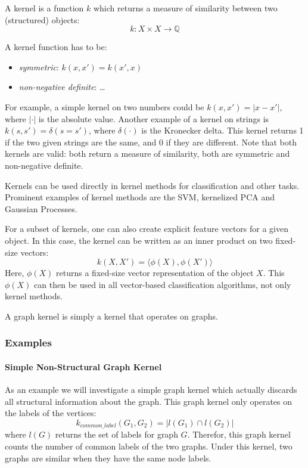 A kernel is a function $k$ which returns a measure of similarity between two (structured) objects:
\begin{equation*}
k: X \times X \rightarrow \mathbb{Q}
\end{equation*}

A kernel function has to be:
\begin{itemize}
    \item{\textit{symmetric}: $k(x, x') = k(x', x)$}
    \item{\textit{non-negative definite}: \dots}
\end{itemize}

For example, a simple kernel on two numbers could be $k(x, x') = | x - x' |$, where $| \cdot |$ is the absolute value.
Another example of a kernel on strings is $k(s, s') = \delta(s = s')$, where $\delta(\cdot)$ is the Kronecker delta. This kernel returns 1 if the two given strings are the same, and 0 if they are different.
Note that both kernels are valid: both return a measure of similarity, both are symmetric and non-negative definite.

Kernels can be used directly in kernel methods for classification and other tasks.
Prominent examples of kernel methods are the SVM, kernelized PCA and Gaussian Processes.

For a subset of kernels, one can also create explicit feature vectors for a given object. In this case, the kernel can be written as an inner product on two fixed-size vectors:
\begin{equation*}
    k(X, X') = \langle \phi(X), \phi(X') \rangle
\end{equation*}
Here, $\phi(X)$ returns a fixed-size vector representation of the object $X$.
This $\phi(X)$ can then be used in all vector-based classification algorithms, not only kernel methods.

A graph kernel is simply a kernel that operates on graphs.

\subsubsection{Examples}
\paragraph{Simple Non-Structural Graph Kernel}
As an example we will investigate a simple graph kernel which actually discards all structural information about the graph. This graph kernel only operates on the labels of the vertices:
\begin{equation*}
k_{common\_label}(G_1, G_2) = | l(G_1) \cap l(G_2) |
\end{equation*}
where $l(G)$ returns the set of labels for graph $G$.
Therefor, this graph kernel counts the number of common labels of the two graphs. Under this kernel, two graphs are similar when they have the same node labels.

